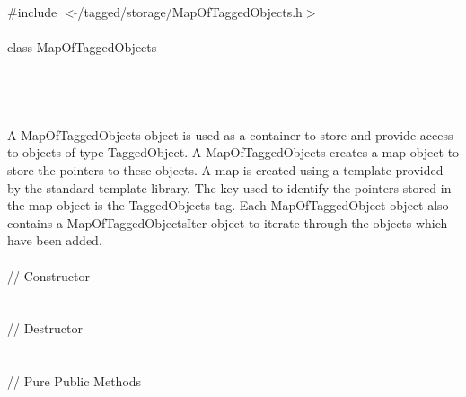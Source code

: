 
   \\
\indent \#include $<\tilde{ }$/tagged/storage/MapOfTaggedObjects.h$>$ \\

  \\
\indent class MapOfTaggedObjects  \\

 \\
 \\
\indent{} \\

  \\
\indent A MapOfTaggedObjects object is used as a container to store and
provide access to objects of type TaggedObject. A MapOfTaggedObjects
creates a map object to store the pointers to these objects. A map is
created using a template provided by the standard template
library. The key used to identify the pointers stored in the map
object is the TaggedObjects tag. Each MapOfTaggedObject object also contains
a MapOfTaggedObjectsIter object to iterate through the objects which
have been added.\\ 

  \\
\indent // Constructor  \\
 \\\\
\indent // Destructor \\
 \\  \\
\indent // Pure Public Methods \\
\\
\\
\\
\\
\\
\\
\\
\\
\\

